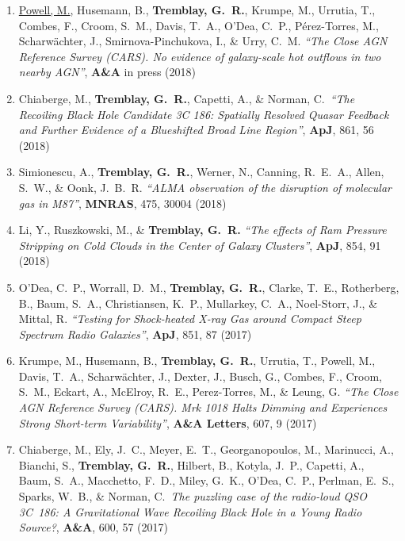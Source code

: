 \documentclass[11pt]{article}
\begin{document}
\begin{enumerate}
\item \uline{Powell, M.}, Husemann, B., \textbf{Tremblay, G.~R.}, Krumpe, M.,
Urrutia, T., Combes, F., Croom, S.~M., Davis, T.~A., O'Dea, C.~P., P\'{e}rez-Torres,
M., Scharw\"{a}chter, J., Smirnova-Pinchukova, I., \& Urry, C.~M. \textit{``The Close AGN Reference Survey (CARS). No evidence of galaxy-scale hot outflows in two nearby AGN''}, \textbf{A\&A} in press (2018)


\item Chiaberge, M., \textbf{Tremblay, G.~R.}, Capetti, A., \& Norman, C.~\textit{``The Recoiling Black Hole Candidate 3C 186: Spatially Resolved Quasar Feedback and Further Evidence of a Blueshifted Broad Line Region''},
\textbf{ApJ}, 861, 56 (2018)


\item Simionescu, A., \textbf{Tremblay, G.~R.}, Werner, N., Canning, R.~E.~A., Allen, S.~W., \& Oonk, J.~B.~R.
\textit{``ALMA observation of the disruption of
molecular gas in M87''}, \textbf{MNRAS}, 475, 30004 (2018)


\item Li, Y., Ruszkowski, M., \& \textbf{Tremblay, G.~R.} \textit{``The effects of Ram Pressure Stripping on Cold Clouds in the Center of Galaxy Clusters''}, \textbf{ApJ}, 854, 91 (2018)


\item O'Dea, C.~P., Worrall, D.~M., \textbf{Tremblay, G.~R.}, Clarke, T.~E., Rotherberg, B., Baum, S.~A.,
Christiansen, K.~P., Mullarkey, C.~A., Noel-Storr,
J., \& Mittal, R. \textit{``Testing for Shock-heated X-ray Gas around Compact Steep Spectrum Radio Galaxies''}, \textbf{ApJ}, 851, 87 (2017)


\item Krumpe, M., Husemann, B., \textbf{Tremblay, G.~R.}, Urrutia, T., Powell, M., Davis, T.~A., Scharw\"{a}chter, J., Dexter, J., Busch, G., Combes, F., Croom, S.~M.,
Eckart, A., McElroy, R.~E., Perez-Torres, M., \& Leung, G. \textit{``The Close AGN Reference Survey (CARS). Mrk 1018 Halts Dimming and Experiences Strong Short-term Variability''}, \textbf{A\&A Letters}, 607, 9 (2017)



\item Chiaberge, M., Ely, J.~C., Meyer, E.~T., Georganopoulos, M., Marinucci, A., Bianchi, S.,  \textbf{Tremblay, G.~R.}, Hilbert, B.,
Kotyla, J.~P., Capetti, A., Baum, S.~A.,  Macchetto, F.~D., Miley, G.~K.,
O'Dea, C.~P., Perlman, E.~S., Sparks, W.~B., \& Norman, C.\ \textit{The puzzling case of the radio-loud QSO 3C~186: A Gravitational Wave Recoiling Black Hole in a Young Radio Source?}, \textbf{A\&A}, 600, 57 (2017)



\end{enumerate}
\end{document}
